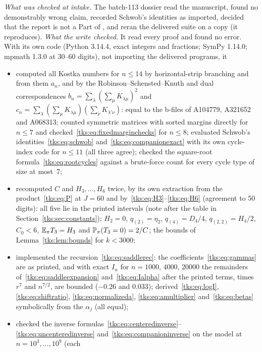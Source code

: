 \begin{writenote}
\emph{What was checked at intake.} The batch-113 dossier read the manuscript,
found no demonstrably wrong claim, recorded Schwob's identities as imported,
decided that the report is not a Part of
, and reran the delivered suite on a
copy (it reproduces). \emph{What the write checked.} It read every proof and
found no error. With its own code (Python 3.14.4, exact integers and
fractions; SymPy 1.14.0; mpmath 1.3.0 at 30--60 digits), not importing the
delivered programs, it
\begin{itemize}\raggedright
\item computed all Kostka numbers for $n\le14$ by horizontal-strip branching
and from them $a_n$, and by the Robinson--Schensted--Knuth and dual
correspondences $b_n=\sum_\lambda(\sum_\mu K_{\lambda\mu})^2$ and
$c_n=\sum_\lambda(\sum_\mu K_{\lambda\mu})(\sum_\nu K_{\lambda'\nu})$: equal to
the b-files of A104779, A321652 and A068313; counted symmetric matrices with
sorted margins directly for $n\le7$ and checked~\eqref{tks:eq:fixedmarginchecks}
for $n\le8$; evaluated Schwob's identities~\eqref{tks:eq:schwob}
and~\eqref{tks:eq:companionexact} with its own cycle-index code for $n\le11$
(all three agree); checked the square-root formula~\eqref{tks:eq:rootcycles}
against a brute-force count for every cycle type of size at most~7;
\item recomputed $C$ and $H_3,\ldots,H_6$ twice, by its own extraction from
the product~\eqref{tks:eq:P} at $J=60$ and by~\eqref{tks:eq:H3}--\eqref{tks:eq:H6}
(agreement to 50 digits): all five lie in the printed intervals (note after
the table in Section~\ref{tks:sec:constants}); $H_2=0$, $q_{(2)}=\eta_2$,
$q_{(4)}=D_4/4$, $q_{(2,2)}=H_4/2$, $C_0<6$, $\mathbb E_\pi T_3=H_3$ and
$\mathbb P_\pi(T_3=0)=2/C$; the bounds of Lemma~\ref{tks:lem:bounds} for $k<3000$;
\item implemented the recursion~\eqref{tks:eq:saddlerec}: the
coefficients~\eqref{tks:eq:gammas} are as printed, and with exact $I_n$ for
$n=1000$, $4000$, $20000$ the remainders of~\eqref{tks:eq:saddleexpansion}
and~\eqref{tks:eq:Ialpha} after the printed terms, times $r^7$ and $n^{7/2}$,
are bounded ($-0.26$ and $0.033$); derived~\eqref{tks:eq:logI},
\eqref{tks:eq:shiftratio}, \eqref{tks:eq:normalizeda},
\eqref{tks:eq:amultiplier} and~\eqref{tks:eq:betas} symbolically from the
$\alpha_j$ (all equal);
\item checked the inverse formulas~\eqref{tks:eq:centeredinverse}--\eqref{tks:eq:uncenteredinverse}
and~\eqref{tks:eq:companioninverse} on the model at $n=10^3,\ldots,10^9$ (each

\end{itemize}
\end{writenote}
